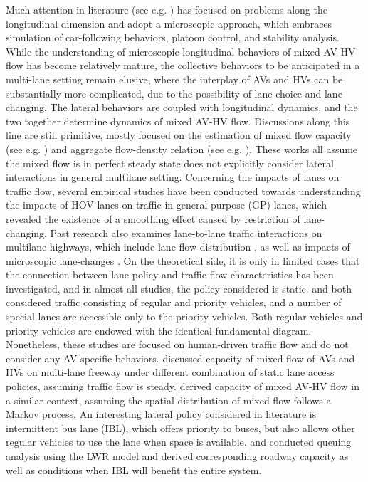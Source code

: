 \documentclass[oneside,letter,11pt]{article}
\begin{document}
Much attention in literature (see e.g. \cite{bose2003analysis}\cite{talebpour2016influence}\cite{olia2018traffic}\cite{wang2014rolling}\cite{gong2016constrained}\cite{zhou2017parsimonious}) has focused on problems along the longitudinal dimension and adopt a microscopic approach, which embraces simulation of car-following behaviors, platoon control, and stability analysis. While the understanding of microscopic longitudinal behaviors of mixed AV-HV flow has become relatively mature, the collective behaviors to be anticipated in a multi-lane setting remain elusive, where the interplay of AVs and HVs can be substantially more complicated, due to the possibility of lane choice and lane changing. The lateral behaviors are coupled with longitudinal dynamics, and the two together determine dynamics of mixed AV-HV flow. Discussions along this line are still primitive, mostly focused on the estimation of mixed flow capacity (see e.g. \cite{chen2017towards}\cite{ghiasi2017mixed}) and aggregate flow-density relation (see e.g. \cite{rao1993flow}\cite{levin2016multiclass}). These works all assume the mixed flow is in perfect steady state does not explicitly consider lateral interactions in general multilane setting. Concerning the impacts of lanes on traffic flow, several empirical studies \cite{menendez2007effects}\cite{daganzo2008effects}\cite{cassidy2009spatiotemporal}\cite{cassidy2010smoothing} have been conducted towards understanding the impacts of HOV lanes on traffic in general purpose (GP) lanes, which revealed the existence of a smoothing effect caused by restriction of lane-changing. Past research also examines lane-to-lane traffic interactions on multilane highways, which include lane flow distribution \cite{michalopoulos1984multilane}\cite{shiomi2015multilane}, as well as impacts of microscopic lane-changes \cite{laval2006lc}\cite{ahn2007freeway}. On the theoretical side, it is only in limited cases that the connection between lane policy and traffic flow characteristics has been investigated, and in almost all studies, the policy considered is static. \cite{daganzo1997continuum} and \cite{jin2018new} both considered traffic consisting of regular and priority vehicles, and a number of special lanes are accessible only to the priority vehicles. Both regular vehicles and priority vehicles are endowed with the identical fundamental diagram. Nonetheless, these studies are focused on human-driven traffic flow and do not consider any AV-specific behaviors. \cite{chen2017towards} discussed capacity of mixed flow of AVs and HVs on multi-lane freeway under different combination of static lane access policies, assuming traffic flow is steady. \cite{ghiasi2017mixed} derived capacity of mixed AV-HV flow in a similar context, assuming the spatial distribution of mixed flow follows a Markov process. An interesting lateral policy considered in literature is intermittent bus lane (IBL), which offers priority to buses, but also allows other regular vehicles to use the lane when space is available. \cite{eichler2006bus} and \cite{chiabaut2012road} conducted queuing analysis using the LWR model and derived corresponding roadway capacity as well as conditions when IBL will benefit the entire system.
\end{document}
